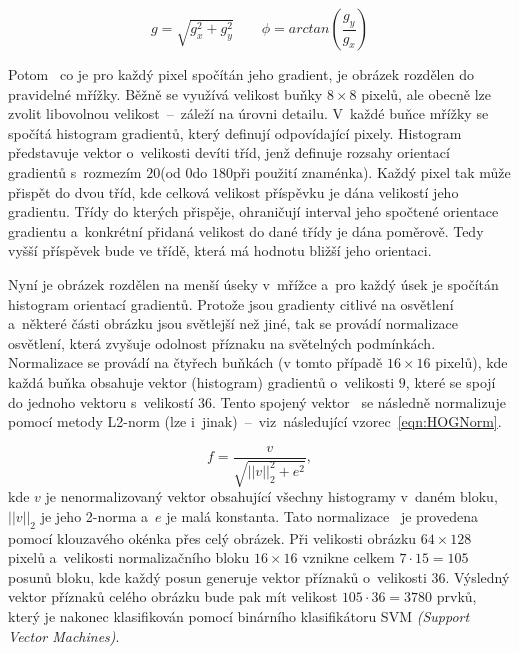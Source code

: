 \begin{equation}
    \label{eqn:HOGGradient}
    g = \sqrt{g_{x}^{2} + g_{y}^{2}}
    \qquad
    \phi = arctan \left( \frac{g_y}{g_x} \right)
\end{equation}

Potom~\cite{website:IntroToHOG} co je pro každý pixel spočítán jeho gradient, je obrázek rozdělen do pravidelné mřížky. Běžně se využívá velikost buňky $8 \times 8$ pixelů, ale obecně lze zvolit libovolnou velikost~--~záleží na úrovni detailu. V~každé buňce mřížky se spočítá histogram gradientů, který definují odpovídající pixely. Histogram představuje vektor o~velikosti devíti tříd, jenž definuje rozsahy orientací gradientů s~rozmezím $20$\textdegree\space (od $0$\textdegree\space do $180$\textdegree\space při použití znaménka). Každý pixel tak může přispět do dvou tříd, kde celková velikost příspěvku je dána velikostí jeho gradientu. Třídy do kterých přispěje, ohraničují interval jeho spočtené orientace gradientu a~konkrétní přidaná velikost do dané třídy je dána poměrově. Tedy vyšší příspěvek bude ve třídě, která má hodnotu bližší jeho orientaci.

Nyní je obrázek rozdělen na menší úseky v~mřížce a~pro každý úsek je spočítán histogram orientací gradientů. Protože jsou gradienty citlivé na osvětlení a~některé části obrázku jsou světlejší než jiné, tak se provádí normalizace osvětlení, která zvyšuje odolnost příznaku na světelných podmínkách. Normalizace se provádí na čtyřech buňkách (v tomto případě $16 \times 16$ pixelů), kde každá buňka obsahuje vektor (histogram) gradientů o~velikosti $9$, které se spojí do jednoho vektoru s~velikostí $36$. Tento spojený vektor~\cite{article:HOG4Detection} se následně normalizuje pomocí metody L2-norm (lze i~jinak)~--~viz~následující vzorec~\ref{eqn:HOGNorm}.

\begin{equation}
    \label{eqn:HOGNorm}
    f = \frac{v}{\sqrt{||v||_{2}^{2} + e^{2}}},
\end{equation}
kde $v$ je nenormalizovaný vektor obsahující všechny histogramy v~daném bloku, $||v||_{2}$ je jeho 2-norma a~$e$ je malá konstanta. Tato normalizace~\cite{website:IntroToHOG} je provedena pomocí klouzavého okénka přes celý obrázek. Při velikosti obrázku $64 \times 128$ pixelů a~velikosti normalizačního bloku $16 \times 16$ vznikne celkem $7 \cdot 15 = 105$ posunů bloku, kde každý posun generuje vektor příznaků o~velikosti $36$. Výsledný vektor příznaků celého obrázku bude pak mít velikost $105 \cdot 36 = 3780$ prvků, který je nakonec klasifikován pomocí binárního klasifikátoru SVM \emph{(Support Vector Machines)}.

